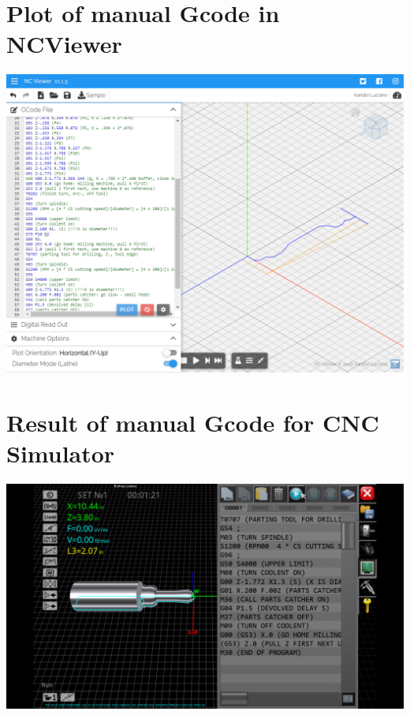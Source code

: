 \documentclass{report}
\begin{document}
\chapter{Plot of manual Gcode in NCViewer}
\begin{landscape}
\includegraphics[height=\textheight]{img/prj05-manual-gcode-ncviewer-plot.png}
\end{landscape}

\addtocounter{chapter}{1}


\chapter{Result of manual Gcode for CNC Simulator}
\begin{landscape}
\null\vfill
\includegraphics[width=\linewidth]{img/prj05-cnc_simulator_result.png}
\vfill
\end{landscape}
\end{document}
